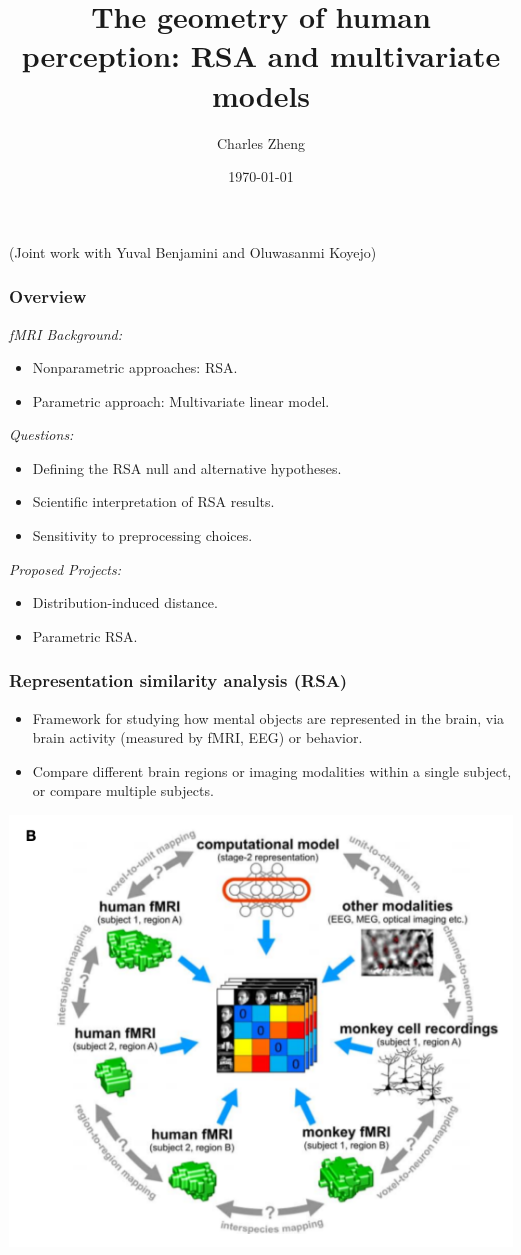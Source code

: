 \documentclass{beamer}
\title[Informal]{The geometry of human perception: RSA and multivariate models}
\author{Charles Zheng} %
\institute[Stanford] %
{Stanford University}
\date{\today} %
\begin{document}
\begin{frame}
\titlepage %
(Joint work with Yuval Benjamini and Oluwasanmi Koyejo)
\end{frame}

\begin{frame}
\frametitle{Overview}
\noindent\emph{fMRI Background:}
\begin{itemize}
\item Nonparametric approaches: RSA.
\item Parametric approach: Multivariate linear model.
\end{itemize}
\noindent\emph{Questions:}
\begin{itemize}
\item Defining the RSA null and alternative hypotheses.
\item Scientific interpretation of RSA results.
\item Sensitivity to preprocessing choices.
\end{itemize}
\noindent\emph{Proposed Projects:}
\begin{itemize}
\item Distribution-induced distance.
\item Parametric RSA.
\end{itemize}
\end{frame}

\begin{frame}
\frametitle{Representation similarity analysis (RSA)}
\begin{itemize}
\item Framework for studying how mental objects are represented in the brain,
via brain activity (measured by fMRI, EEG) or behavior.
\item Compare different brain regions or imaging modalities within a single subject, or compare multiple subjects.
\end{itemize}
\begin{center}
\includegraphics[scale = 0.3]{k08_b.png}
\end{center}
\end{frame}
\end{document}
